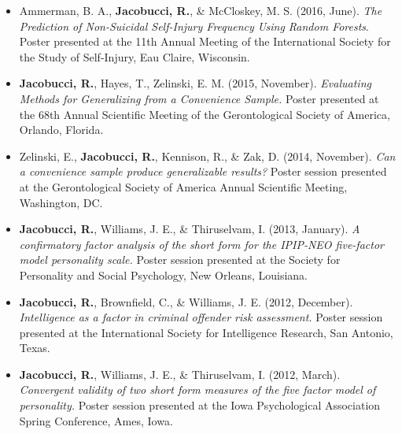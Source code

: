 \documentclass[letterpaper,10pt]{article}
\begin{document}
\begin{itemize}
	\item[]Ammerman, B. A., \textbf{Jacobucci, R.}, \& McCloskey, M. S. (2016, June). \textit{The Prediction of Non-Suicidal Self-Injury Frequency Using Random Forests}. Poster presented at the 11th Annual Meeting of the International Society for the Study of Self-Injury, Eau Claire, Wisconsin.
	\item[] \textbf{Jacobucci, R.}, Hayes, T., Zelinski, E. M. (2015, November). \emph{Evaluating Methods for Generalizing from a Convenience Sample.} Poster presented at the 68th Annual Scientific Meeting of the Gerontological Society of America, Orlando, Florida.
	\item[]Zelinski, E., \textbf{Jacobucci, R.}, Kennison, R., \& Zak, D. (2014, November). \emph{Can a convenience sample produce generalizable results?} Poster session presented at the Gerontological Society of America Annual Scientific Meeting, Washington, DC.
	\item[]\textbf{Jacobucci, R.}, Williams, J. E., \& Thiruselvam, I. (2013, January). \emph{A confirmatory factor analysis of the short form for the IPIP-NEO five-factor model personality scale.} Poster session presented at the Society for Personality and Social Psychology, New Orleans, Louisiana.
	\item[]\textbf{Jacobucci, R.}, Brownfield, C., \& Williams, J. E. (2012, December). \emph{Intelligence as a factor in criminal offender risk assessment.} Poster session presented at the International Society for Intelligence Research, San Antonio, Texas.
	\item []\textbf{Jacobucci, R.}, Williams, J. E., \& Thiruselvam, I. (2012, March). \emph{Convergent validity of two short form measures of the five factor model of personality.} Poster session presented at the Iowa Psychological Association Spring Conference, Ames, Iowa.
	
\end{itemize}
\end{document}
